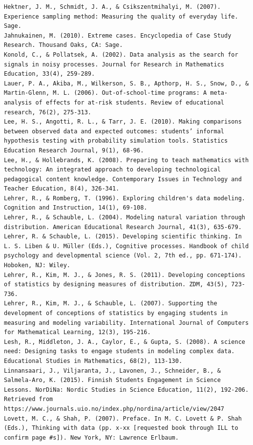 \documentclass[]{msu-thesis}
\theoremstyle{definition}
\theoremstyle{definition}
\theoremstyle{definition}
\theoremstyle{remark}
\begin{document}
\begin{verbatim}
Hektner, J. M., Schmidt, J. A., & Csikszentmihalyi, M. (2007). Experience sampling method: Measuring the quality of everyday life. Sage.  
Jahnukainen, M. (2010). Extreme cases. Encyclopedia of Case Study Research. Thousand Oaks, CA: Sage.
Konold, C., & Pollatsek, A. (2002). Data analysis as the search for signals in noisy processes. Journal for Research in Mathematics Education, 33(4), 259-289.  
Lauer, P. A., Akiba, M., Wilkerson, S. B., Apthorp, H. S., Snow, D., & Martin-Glenn, M. L. (2006). Out-of-school-time programs: A meta-analysis of effects for at-risk students. Review of educational research, 76(2), 275-313.  
Lee, H. S., Angotti, R. L., & Tarr, J. E. (2010). Making comparisons between observed data and expected outcomes: students’ informal hypothesis testing with probability simulation tools. Statistics Education Research Journal, 9(1), 68-96.  
Lee, H., & Hollebrands, K. (2008). Preparing to teach mathematics with technology: An integrated approach to developing technological pedagogical content knowledge. Contemporary Issues in Technology and Teacher Education, 8(4), 326-341.  
Lehrer, R., & Romberg, T. (1996). Exploring children's data modeling. Cognition and Instruction, 14(1), 69-108.  
Lehrer, R., & Schauble, L. (2004). Modeling natural variation through distribution. American Educational Research Journal, 41(3), 635-679.  
Lehrer, R. & Schauble, L. (2015). Developing scientific thinking. In L. S. Liben & U. Müller (Eds.), Cognitive processes. Handbook of child psychology and developmental science (Vol. 2, 7th ed., pp. 671-174). Hoboken, NJ: Wiley.  
Lehrer, R., Kim, M. J., & Jones, R. S. (2011). Developing conceptions of statistics by designing measures of distribution. ZDM, 43(5), 723-736.  
Lehrer, R., Kim, M. J., & Schauble, L. (2007). Supporting the development of conceptions of statistics by engaging students in measuring and modeling variability. International Journal of Computers for Mathematical Learning, 12(3), 195-216.  
Lesh, R., Middleton, J. A., Caylor, E., & Gupta, S. (2008). A science need: Designing tasks to engage students in modeling complex data. Educational Studies in Mathematics, 68(2), 113-130.  
Linnansaari, J., Viljaranta, J., Lavonen, J., Schneider, B., & Salmela-Aro, K. (2015). Finnish Students Engagement in Science Lessons. NorDiNa: Nordic Studies in Science Education, 11(2), 192-206. Retrieved from https://www.journals.uio.no/index.php/nordina/article/view/2047  
Lovett, M. C., & Shah, P. (2007). Preface. In M. C. Lovett & P. Shah (Eds.), Thinking with data (pp. x-xx [requested book through ILL to confirm page #s]). New York, NY: Lawrence Erlbaum.  

\end{verbatim}
\end{document}

